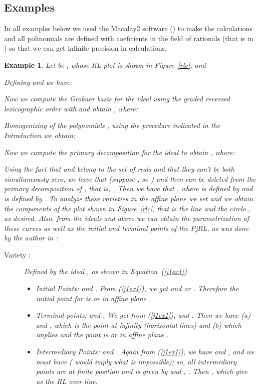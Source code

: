 \documentclass{article}
\newtheorem{example}{Example}[section]
\begin{document}
\subsection{Examples}


In all examples below we used the Macalay2 software (\cite{mac}) to make the calculations 
and all polinomials are defined with coeficients in the field of rationals (that is in 
) so that we can get infinite precision in calculations.

\begin{example}\label{ex1}\em
Let be , whose RL plot is shown in Figure~\ref{rlc}, and

Defining  and  we
have:

Now we compute the Grobner basis for the ideal 
using the graded reversed lexicographic order with 
 and obtain , where:

Homogenizing of the polynomials , using the
procedure indicated in the Introduction we obtain:

Now we compute the primary decomposition for the ideal 
 to
obtain , where:

Using the fact that  and  belong to the set of reals and that they can't be both
simultaneously zero, we have that  (suppose , so )
and then  can be deleted from the primary decomposition of
, that is, . Then we have that ,
where  is defined by  and  is defined by . To analyze
these varieties in the affine  plane we set  and we obtain the components of the 
plot shown in Figure~\ref{rlc}, that is the line  and the circle , as desired. Also, from 
the ideals  and  above we can obtain the parametrization of these curves as well as the initial and terminal
points of the PjRL, as was done by the author in \cite{pjrl}:
\begin{description}
\item[Variety :] Defined by the ideal , as shown in Equation~(\ref{j1ex1})
\begin{itemize}
\item Initial Points:  and . From (\ref{j1ex1}), we get  and  or . Therefore the initial 
point 
for  is  or  in affine plane .
\item Terminal points:  and . We get from (\ref{j1ex1}),  and . Then we have (a)  and 
, which is
the point at infinity  (horizontal lines) and (b)  which implies  and the point is  or 
 in affine plane .
\item Intermediary Points:  and . Again from (\ref{j1ex1}), we have  and 
,
and we must have  ( would imply  what is impossible); so, all intermediary points are at finite position 
and is given by
 and , . Then , which 
give us the 
RL over  line.


\end{itemize}
\end{description}
\end{example}
\end{document}
